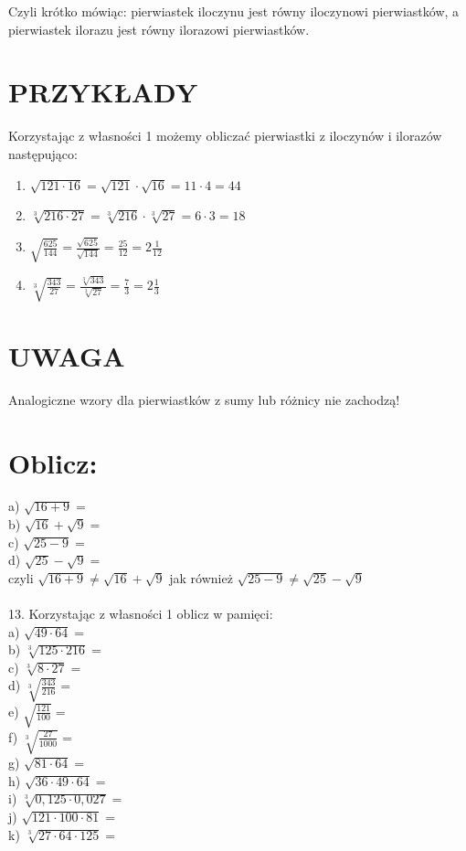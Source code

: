 \documentclass[10pt]{article}
\begin{document}
Czyli krótko mówiąc: pierwiastek iloczynu jest równy iloczynowi pierwiastków, a pierwiastek ilorazu jest równy ilorazowi pierwiastków.

\section*{PRZYKŁADY}
Korzystając z własności 1 możemy obliczać pierwiastki z iloczynów i ilorazów następująco:

\begin{enumerate}
  \item \(\sqrt{121 \cdot 16}=\sqrt{121} \cdot \sqrt{16}=11 \cdot 4=44\)
  \item \(\sqrt[3]{216 \cdot 27}=\sqrt[3]{216} \cdot \sqrt[3]{27}=6 \cdot 3=18\)
  \item \(\sqrt{\frac{625}{144}}=\frac{\sqrt{625}}{\sqrt{144}}=\frac{25}{12}=2 \frac{1}{12}\)
  \item \(\sqrt[3]{\frac{343}{27}}=\frac{\sqrt[3]{343}}{\sqrt[3]{27}}=\frac{7}{3}=2 \frac{1}{3}\)
\end{enumerate}

\section*{UWAGA}
Analogiczne wzory dla pierwiastków z sumy lub różnicy nie zachodzą!

\section*{Oblicz:}
a) \(\sqrt{16+9}=\)\\
b) \(\sqrt{16}+\sqrt{9}=\)\\
c) \(\sqrt{25-9}=\)\\
d) \(\sqrt{25}-\sqrt{9}=\)\\
czyli \(\sqrt{16+9} \neq \sqrt{16}+\sqrt{9}\) jak również \(\sqrt{25-9} \neq \sqrt{25}-\sqrt{9}\)\\
\(\qquad\)\\
13. Korzystając z własności 1 oblicz w pamięci:\\
a) \(\sqrt{49 \cdot 64}=\)\\
b) \(\sqrt[3]{125 \cdot 216}=\)\\
c) \(\sqrt[3]{8 \cdot 27}=\)\\
d) \(\sqrt[3]{\frac{343}{216}}=\)\\
e) \(\sqrt{\frac{121}{100}}=\)\\
f) \(\sqrt[3]{\frac{27}{1000}}=\)\\
g) \(\sqrt{81 \cdot 64}=\)\\
h) \(\sqrt{36 \cdot 49 \cdot 64}=\)\\
i) \(\sqrt[3]{0,125 \cdot 0,027}=\)\\
j) \(\sqrt{121 \cdot 100 \cdot 81}=\)\\
k) \(\sqrt[3]{27 \cdot 64 \cdot 125}=\)
\end{document}
